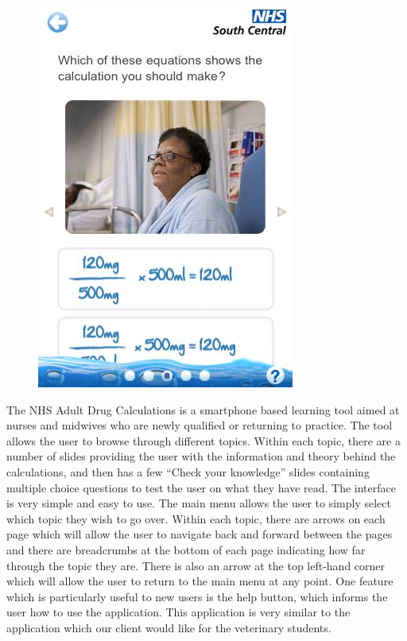 \documentclass{l3proj}
\begin{document}
\begin{figure}[!htb]
  \includegraphics[width=\linewidth]{images/NHSDrugApp/NHSDrugApp4.png}
\endminipage
\end{figure}


The NHS Adult Drug Calculations is a smartphone based learning tool aimed at nurses and midwives who are newly qualified or returning to practice. The tool allows the user to browse through different topics. Within each topic, there are a number of slides providing the user with the information and theory behind the calculations, and then has a few ``Check your knowledge'' slides containing multiple choice questions to test the user on what they have read. The interface is very simple and easy to use. The main menu allows the user to simply select which topic they wish to go over. Within each topic, there are arrows on each page which will allow the user to navigate back and forward between the pages and there are breadcrumbs at the bottom of each page indicating how far through the topic they are.  There is also an arrow at the top left-hand corner which will allow the user to return to the main menu at any point. One feature which is particularly useful to new users is the help button, which informs the user how to use the application. This application is very similar to the application which our client would like for the veterinary students.
\end{document}
